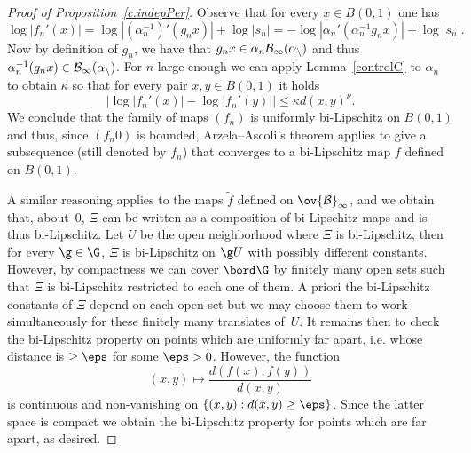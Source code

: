 \begin{proof}[Proof of Proposition~\ref{c.indepPer}]
Observe that for every $x\in B(0,1)$ one has
\[
\log\left|f_n'(x)\right|=\log\left|\left(\alpha_n^{-1}\right)'(g_nx)\right|+\log|s_n|= -\log\left|\alpha_n'\left(\alpha_n^{-1}g_nx\right)\right|+\log|s_n|.
\]
Now by definition of $g_n$, we have that $g_nx \in\alpha_n\cal B_\infty(\alpha_n)$ and thus $\alpha_n^{-1}(g_nx)\in\cal B_\infty(\alpha_n)$. For $n$ large enough we can apply Lemma~\ref{controlC} to $\alpha_n$ to obtain $\kappa$ so that for every pair $x,y\in B(0,1)$ it holds
\[
\bigl\lvert\log\left|f_n'(x)\right|-\log\left|f_n'(y)\right|\bigr|\leq \kappa d(x,y)^\nu.
\]
We conclude that the family of maps $(f_n)$ is uniformly bi-Lipschitz on $B(0,1)$ and thus, since $(f_n0)$ is bounded, Arzela--Ascoli's theorem applies to give a subsequence (still denoted by $f_n$) that converges to a bi-Lipschitz map $f$ defined on $B(0,1)$.


A similar reasoning applies to the maps $\tilde f$ defined on $\ov{\cal B}_\infty$, and we obtain that, about~$0$, $\Xi$ can be written as a composition of bi-Lipschitz maps and is thus bi-Lipschitz. Let $U$ be the open neighborhood where $\Xi$ is bi-Lipschitz, then for every $\g\in\G$, $\Xi$ is bi-Lipschitz on $\g U$ with possibly different constants. However, by compactness we can cover $\bord\G$ by finitely many open sets such that $\Xi$ is bi-Lipschitz restricted to each one of them. A priori the bi-Lipschitz constants of $\Xi$ depend on each open set but we may choose them to work simultaneously for these finitely many translates of~$U$. It remains then to check the bi-Lipschitz property on points which are uniformly far apart, i.e. whose distance is $\geq\eps$ for some $\eps>0$. However, the function
\[
(x,y)\mapsto \frac{d(f(x),f(y))}{d(x,y)}
\]
is continuous and non-vanishing on $\{(x,y):d(x,y)\geq\eps\}$. Since the latter space is compact we obtain the bi-Lipschitz property for points which are far apart, as desired.
\end{proof}

